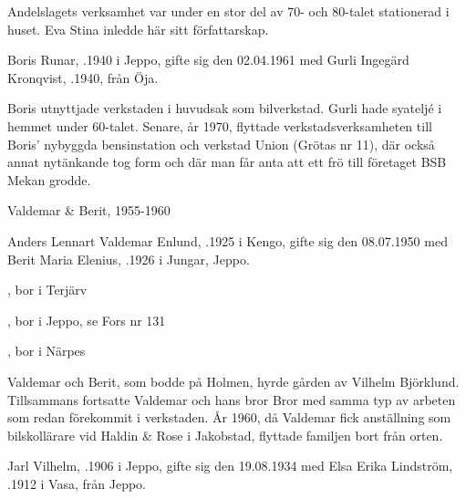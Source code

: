 Andelslagets verksamhet var under en stor del av 70- och 80-talet stationerad i huset. Eva Stina inledde här sitt författarskap.


Boris Runar, .1940 i Jeppo, gifte sig den 02.04.1961 med Gurli Ingegärd Kronqvist, .1940, från Öja.
\begin{jhchildren}
  \item {}
  \item {}
  \item {}
\end{jhchildren}

Boris utnyttjade verkstaden i huvudsak som bilverkstad. Gurli hade syateljé i hemmet under 60-talet. Senare, år 1970, flyttade verkstadsverksamheten till Boris' nybyggda bensinstation och verkstad Union (Grötas nr 11), där också annat nytänkande tog form och där man får anta att ett frö till företaget BSB Mekan grodde.



 Valdemar \& Berit, 1955-1960

Anders Lennart Valdemar Enlund, .1925 i Kengo, gifte sig den 08.07.1950 med Berit Maria Elenius, .1926 i Jungar, Jeppo.
\begin{jhchildren}
  \item {}, bor i Terjärv
  \item {}, bor i Jeppo, se Fors nr 131
  \item {}, bor i Närpes
\end{jhchildren}
Valdemar och Berit, som bodde på Holmen, hyrde gården av Vilhelm 	Björklund. Tillsammans fortsatte Valdemar och hans bror Bror med samma typ av arbeten som redan förekommit i verkstaden. År 1960, då Valdemar fick anställning som bilskollärare vid Haldin \& Rose i Jakobstad, flyttade familjen bort från orten.


Jarl Vilhelm, .1906 i Jeppo, gifte sig den 19.08.1934 med Elsa Erika Lindström, .1912 i Vasa, från Jeppo.
\begin{jhchildren}
  \item {}
  \item {}
\end{jhchildren}

